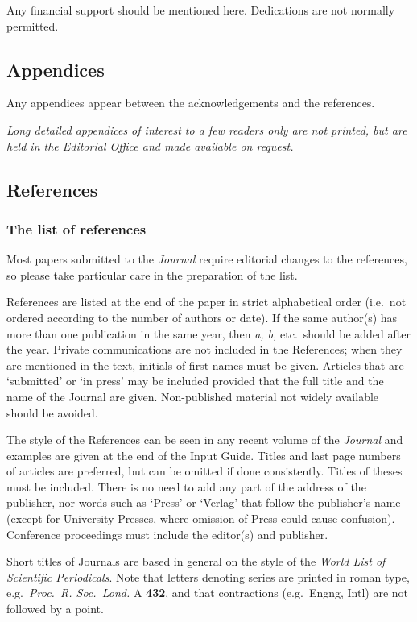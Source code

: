 \documentclass{jfm}
\begin{document}
Any financial support should be mentioned here. Dedications are not normally
permitted.

\subsection{Appendices}

Any appendices appear between the acknowledgements and the references.

\emph{Long detailed appendices of interest to a few readers only are not
printed, but are held in the Editorial Office and made available on request.}

\subsection{References}

\subsubsection{The list of references}

Most papers submitted to the \emph{Journal} require editorial changes to the
references, so please take particular care in the preparation of the list.

References are listed at the end of the paper in strict alphabetical
order (i.e.\ not ordered according to the number of authors or date). If the
same author(s) has more than one publication in the same year, then \textit{a,
b,} etc.\ should be added after the year.  Private communications are not
included in the References; when they are mentioned in the text, initials of
first names must be given. Articles that are `submitted' or `in press' may be
included provided that the full title and the name of the Journal are given.
Non-published material not widely available should be avoided.

The style of the References can be seen in any recent volume of the
\emph{Journal} and examples are given at the end of the Input Guide. Titles
and last page numbers of articles are preferred, but can be omitted  if
done consistently. Titles of theses must be included. There is no need to
add any part of the address of the publisher, nor words such as `Press' or
`Verlag' that follow the publisher's name (except for University Presses,
where omission of Press could cause confusion). Conference proceedings must
include the editor(s) and publisher.

Short titles of Journals are based in general on the style of the \emph{World
List of Scientific Periodicals}. Note that letters denoting series are
printed in roman type, e.g.\ \emph{Proc.\ R. Soc.\ Lond.} A \textbf{432}, and
that contractions (e.g.\ Engng, Intl) are not followed by a point.
\end{document}
